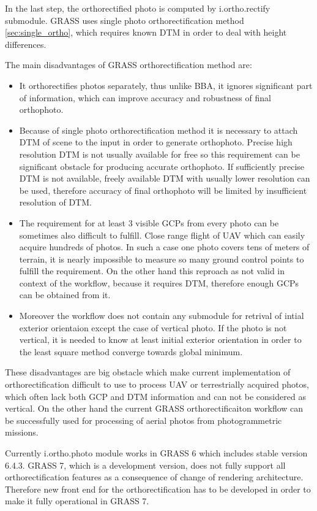 \documentclass[a4paper,12pt]{article}
\begin{document}
In the last step, the orthorectified photo is computed by i.ortho.rectify submodule. GRASS uses single photo orthorectification
method \ref{sec:single_ortho}, which requires known DTM in order to deal with height differences. 

The main disadvantages of GRASS orthorectification method are:
\begin{itemize}
\item It orthorectifies photos separately, thus unlike BBA, it ignores significant part of information,
 which can improve accuracy and robustness of final orthophoto. 
\item Because of single photo orthorectification method it is necessary to attach DTM of scene to the input 
in order to generate orthophoto. Precise high resolution DTM is not usually available for free so this 
requirement can be significant obstacle for producing accurate orthophoto. If sufficiently precise 
DTM is not available, freely available DTM with usually lower resolution can be used, therefore  
accuracy of final orthophoto will be limited by insufficient resolution of DTM.
\item The requirement for at least 3 visible GCPs from every photo can be sometimes also difficult to fulfill.
Close range flight of UAV which can easily acquire hundreds of photos.
In such a case one photo covers tens of meters
of terrain, it is nearly impossible to measure so many ground control points to fulfill the requirement. 
On the other hand this reproach as not valid in context of the workflow, because it requires DTM, therefore 
enough GCPs can be obtained from it.
\item Moreover the workflow does not contain any submodule for retrival of intial exterior orientaion except
 the case of vertical photo.   If the photo 
is not vertical, it is needed to know at least initial exterior orientation 
in order to the least square method converge towards global minimum.
\end{itemize}

These disadvantages are big obstacle which make current implementation of orthorectification difficult to use  
to process UAV or terrestrially acquired photos, which often lack both GCP and DTM information and can not be considered as vertical.
On the other hand the current GRASS orthorectificaiton workflow can be successfully used for processing
of aerial photos from photogrammetric missions.

Currently i.ortho.photo module works in GRASS 6 which includes stable version 6.4.3.
GRASS 7, which is a development version, does not fully support all orthorectification features 
as a consequence of change of rendering architecture.
Therefore new front end for the 
orthorectification has to be developed in order to make it fully operational 
in GRASS 7. 
\end{document}
